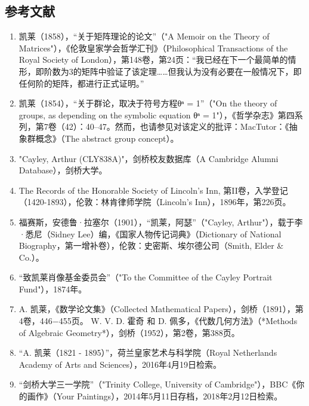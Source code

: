 \subsection{参考文献}  
\begin{enumerate}
\item 凯莱（1858），“关于矩阵理论的论文”（"A Memoir on the Theory of Matrices"），《伦敦皇家学会哲学汇刊》（Philosophical Transactions of the Royal Society of London），第148卷，第24页：“我已经在下一个最简单的情形，即阶数为3的矩阵中验证了该定理……但我认为没有必要在一般情况下，即任何阶的矩阵，都进行正式证明。”  
\item 凯莱（1854），“关于群论，取决于符号方程θⁿ = 1”（"On the theory of groups, as depending on the symbolic equation θⁿ = 1"），《哲学杂志》第四系列，第7卷（42）：40–47。然而，也请参见对该定义的批评：MacTutor：《抽象群概念》（The abstract group concept）。  
\item "Cayley, Arthur (CLY838A)"，剑桥校友数据库（A Cambridge Alumni Database），剑桥大学。  
\item The Records of the Honorable Society of Lincoln's Inn, 第II卷，入学登记（1420-1893），伦敦：林肯律师学院（Lincoln's Inn），1896年，第226页。  
\item 福赛斯，安德鲁·拉塞尔（1901），“凯莱，阿瑟”（"Cayley, Arthur"），载于李·悉尼（Sidney Lee）编，《国家人物传记词典》（Dictionary of National Biography，第一增补卷），伦敦：史密斯、埃尔德公司（Smith, Elder & Co.）。  
\item “致凯莱肖像基金委员会”（"To the Committee of the Cayley Portrait Fund"），1874年。  
\item A. 凯莱，《数学论文集》（Collected Mathematical Papers），剑桥（1891），第4卷，446−455页。  
W. V. D. 霍奇 和 D. 佩多，《代数几何方法》（*Methods of Algebraic Geometry*），剑桥（1952），第2卷，第388页。  
\item “A. 凯莱（1821 - 1895）”，荷兰皇家艺术与科学院（Royal Netherlands Academy of Arts and Sciences），2016年4月19日检索。  
\item “剑桥大学三一学院”（"Trinity College, University of Cambridge"），BBC《你的画作》（Your Paintings），2014年5月11日存档，2018年2月12日检索。  
\end{enumerate}
